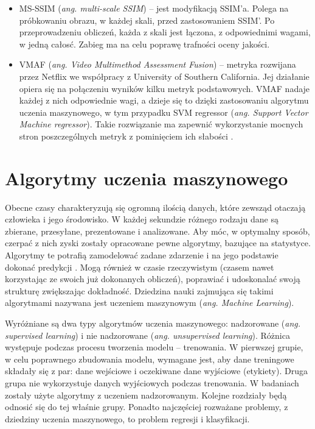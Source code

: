 \begin{itemize}[label=$\bullet$]
\begin{equation}
\end{equation}
\item MS-SSIM ({\em ang. multi-scale SSIM}) -- jest modyfikacją SSIM'a. Polega na próbkowaniu obrazu, w każdej skali, przed zastosowaniem SSIM'. Po przeprowadzeniu obliczeń, każda z skali jest łączona, z odpowiednimi wagami, w jedną całosć. Zabieg ma na celu poprawę trafności oceny jakości\cite{ssim_2}. 
\item VMAF ({\em ang. Video Multimethod Assessment Fusion}) -- metryka rozwijana przez Netflix we współpracy z University of Southern California. Jej działanie opiera się na połączeniu wyników kilku metryk podstawowych. VMAF nadaje każdej z nich odpowiednie wagi, a dzieje się to dzięki zastosowaniu algorytmu uczenia maszynowego, w tym przypadku SVM regressor ({\em ang. Support Vector Machine regressor}). Takie rozwiązanie ma zapewnić wykorzystanie mocnych stron poszczególnych metryk z pominięciem ich słabości \cite{netflix}. 
\end{itemize}

\section{Algorytmy uczenia maszynowego }

Obecne czasy charakteryzują się ogromną ilością danych, które zewsząd otaczają człowieka i jego środowisko. W każdej sekundzie różnego rodzaju dane są zbierane, przesyłane, prezentowane i analizowane. Aby móc, w optymalny sposób, czerpać z nich zyski zostały opracowane pewne algorytmy, bazujące na statystyce. Algorytmy te potrafią zamodelować zadane zdarzenie i na jego    podstawie dokonać predykcji . Mogą również w czasie rzeczywistym (czasem nawet korzystając ze swoich już dokonanych obliczeń), poprawiać i udoskonalać swoją strukturę zwiększając dokładność. Dziedzina nauki zajmująca się takimi algorytmami nazywana jest uczeniem maszynowym ({\em ang. Machine Learning}).\par

Wyróżniane są dwa typy algorytmów uczenia maszynowego: nadzorowane ({\em ang. supervised learning}) i nie nadzorowane ({\em ang. unsupervised learning}). Różnica występuje podczas procesu tworzenia modelu -- trenowania. W pierwszej grupie, w celu poprawnego zbudowania modelu, wymagane jest, aby dane treningowe składały się z par: dane wejściowe i oczekiwane dane wyjściowe (etykiety). Druga grupa nie wykorzystuje danych wyjściowych podczas trenowania. W badaniach zostały użyte algorytmy z uczeniem nadzorowanym. Kolejne rozdziały będą odnosić się do tej właśnie grupy. Ponadto najczęściej rozważane problemy, z dziedziny uczenia maszynowego, to problem regresji i klasyfikacji. \par

